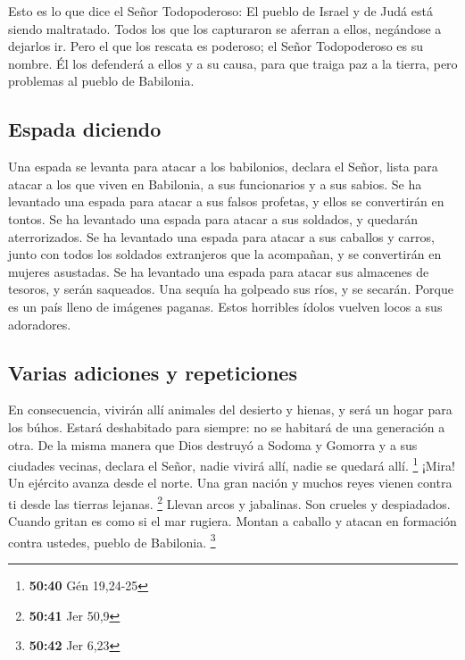  Esto es lo que dice el Señor Todopoderoso: El pueblo de
Israel y de Judá está siendo maltratado. Todos los que los capturaron se
aferran a ellos, negándose a dejarlos ir.  Pero el que
los rescata es poderoso; el Señor Todopoderoso es su nombre. Él los
defenderá a ellos y a su causa, para que traiga paz a la tierra, pero
problemas al pueblo de Babilonia.

\hypertarget{espada-diciendo}{%
\subsection{Espada diciendo}\label{espada-diciendo}}

 Una espada se levanta para atacar a los babilonios,
declara el Señor, lista para atacar a los que viven en Babilonia, a sus
funcionarios y a sus sabios.  Se ha levantado una espada
para atacar a sus falsos profetas, y ellos se convertirán en tontos. Se
ha levantado una espada para atacar a sus soldados, y quedarán
aterrorizados.  Se ha levantado una espada para atacar a
sus caballos y carros, junto con todos los soldados extranjeros que la
acompañan, y se convertirán en mujeres asustadas. Se ha levantado una
espada para atacar sus almacenes de tesoros, y serán saqueados.
 Una sequía ha golpeado sus ríos, y se secarán. Porque es
un país lleno de imágenes paganas. Estos horribles ídolos vuelven locos
a sus adoradores.

\hypertarget{varias-adiciones-y-repeticiones}{%
\subsection{Varias adiciones y
repeticiones}\label{varias-adiciones-y-repeticiones}}

 En consecuencia, vivirán allí animales del desierto y
hienas, y será un hogar para los búhos. Estará deshabitado para siempre:
no se habitará de una generación a otra.  De la misma
manera que Dios destruyó a Sodoma y Gomorra y a sus ciudades vecinas,
declara el Señor, nadie vivirá allí, nadie se quedará allí. \footnote{\textbf{50:40}
  Gén 19,24-25}  ¡Mira! Un ejército avanza desde el
norte. Una gran nación y muchos reyes vienen contra ti desde las tierras
lejanas. \footnote{\textbf{50:41} Jer 50,9}  Llevan arcos
y jabalinas. Son crueles y despiadados. Cuando gritan es como si el mar
rugiera. Montan a caballo y atacan en formación contra ustedes, pueblo
de Babilonia. \footnote{\textbf{50:42} Jer 6,23}

